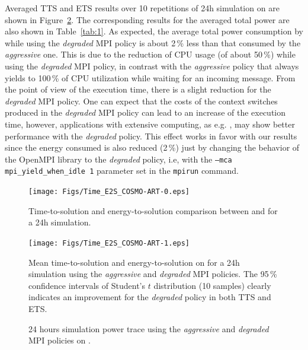 Averaged TTS and ETS results  over 10 repetitions of 24h simulation on
\tinto are shown in  Figure~\ref{fig:4}. The corresponding results for
the  averaged total  power are  also shown  in  Table~\ref{tab:1}.  As
expected, the average total power consumption by \cosmoart while using
the \emph{degraded} MPI policy is about  2\,\% less than that consumed by the
\emph{aggressive} one. This is  due to  the reduction of CPU usage (of about 50\,\%) while using  the \emph{degraded} MPI policy, in
contrast with the \emph{aggressive} policy that always yields to 100\,\% of CPU utilization while waiting for an incoming message. From the point of  view of the execution time, there is a
slight reduction  for the \emph{degraded} MPI  policy. One can  expect that the
costs of the context switches produced in the \emph{degraded} MPI policy can lead to
an  increase  of  the   execution  time,  however,  applications  with
extensive computing,  as e.g.  \cosmoart, may show  better performance
with the \emph{degraded} policy. This effect works in  favor with our results
since the energy consumed is also reduced (2\,\%) just by changing the
behavior of the OpenMPI library  to the \emph{degraded} policy, i.e, with the
\texttt{--mca    mpi\_yield\_when\_idle 1}   parameter   set    in   the
\texttt{mpirun} command.

\begin{figure}[htbf]
  \centering
  \texttt{[image: Figs/Time\_E2S\_COSMO-ART-0.eps]}
  \caption{Time-to-solution and  energy-to-solution comparison between
    \pilat and \monch for a 24h simulation.}
  \label{fig:3}
\end{figure}

\begin{figure}[htbf]
  \centering
  \texttt{[image: Figs/Time\_E2S\_COSMO-ART-1.eps]}
  \vspace{-1cm}
  \caption{Mean time-to-solution and  energy-to-solution on \tinto for
    a 24h simulation using the  \emph{aggressive} and \emph{degraded} MPI policies. The
    95\,\%  confidence  intervals of  Student's  $t$ distribution  (10
    samples) clearly  indicates an improvement for the \emph{degraded} policy in
    both TTS and ETS.}
  \label{fig:4}
\end{figure}

\begin{figure}[ht]
  \centering
  \hspace{0.8cm} \scalebox{0.62}{}
  \caption{24  hours  simulation power  trace  using  the \emph{aggressive}  and
    \emph{degraded} MPI policies on \tinto.}
  \label{fig:5}
\end{figure}

